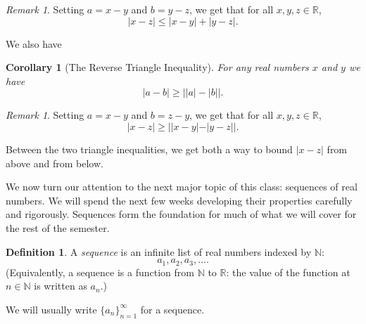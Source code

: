 \documentclass[12pt]{amsart}
\newcommand{\R}{{\mathbb{R}}}
\newcommand{\N}{\mathbb{N}}
\numberwithin{equation}{section}
\theoremstyle{plain} %
\newtheorem{cor}[equation]{Corollary}
\theoremstyle{definition}
\newtheorem{defn}[equation]{Definition}
\theoremstyle{remark}
\newtheorem{rem}[equation]{Remark}
\begin{document}

\begin{rem} Setting $a=x-y$ and $b=y-z$, we get that for all $x,y,z\in \R$,
\[ |x-z| \leq |x-y| + |y-z|.\]
\end{rem}

We also have



\begin{cor}[The Reverse Triangle Inequality] For any real numbers $x$ and $y$ we have
$$
|a - b| \geq \left| |a| - |b| \right|.
$$
\end{cor}


\begin{rem} Setting $a=x-y$ and $b=z-y$, we get that for all $x,y,z\in \R$,
\[ |x-z| \geq ||x-y| - |y-z||.\]
\end{rem}

Between the two triangle inequalities, we get both a way to bound $|x-z|$ from above and from below.







We now turn our attention to the next major topic of this class: sequences of real numbers. We will spend the next few weeks developing their properties carefully and
rigorously. Sequences form the foundation for much of what we will cover for the rest of the semester. 


\begin{defn} A {\em sequence} is an infinite list of real numbers indexed by $\N$:
$$
a_1, a_2, a_3, \dots.
$$
(Equivalently, a sequence is a function from $\N$ to $\R$: the value of the function at $n \in \N$ is written as $a_n$.)

We will usually write $\{a_n\}_{n=1}^\infty$ for a sequence.
\end{defn}
\end{document}
